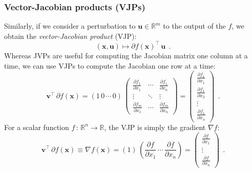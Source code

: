 \documentclass[12pt,dvipsnames]{report}
\renewcommand{\vec}[1]{\boldsymbol{\mathbf{#1}}}
\newcommand{\hquad}{~~}
\begin{document}
\subsubsection{Vector-Jacobian products (VJPs)}
Similarly, if we consider 
a perturbation to $\vec u\in\mathbb{R}^m$ to the output of the $f$, we obtain
the \emph{vector-Jacobian product} (VJP):
\begin{equation}
(\vec{x}, \vec{u}) \mapsto \partial f(\vec{x})^{\intercal}\,\vec u
\hquad.
\label{eq:vjp}
\end{equation}
Whereas JVPs are useful for computing the Jacobian matrix one column at a time, we can use VJPs
to compute the Jacobian one row at a time:
\begin{equation}
    \vec v^\intercal\,\partial f(\vec x)= 
    (1\,0\, \cdots \, 0)\,
    \begin{pmatrix}
\frac{\partial f_{1}}{\partial x_{1}} & \cdots & \frac{\partial f_{1}}{\partial x_{n}} \\
\vdots & \ddots & \vdots \\
\frac{\partial f_{m}}{\partial x_{1}} & \cdots & \frac{\partial f_{m}}{\partial x_{n}}
    \end{pmatrix}
        = \begin{pmatrix}
        \frac{\partial f_{1}}{\partial x_{1}}\\
        \frac{\partial f_{1}}{\partial x_{2}}\\
        \vdots\\
        \frac{\partial f_{1}}{\partial x_{n}}
    \end{pmatrix}
    \hquad.
\end{equation}
For a scalar function $f\,:\,\mathbb{R}^n\rightarrow\mathbb{R}$, the VJP is simply the gradient 
$\nabla f$:
\begin{equation}
    \vec v^\intercal\,\partial f(\vec x)\equiv \nabla f(\vec x)=
    \left(1\right)\,\left(  \frac{\partial f}{\partial x_{1}} \,\cdots\,\frac{\partial f}{\partial x_{n}}   \right)
    =\begin{pmatrix}
        \frac{\partial f}{\partial x_{1}}\\
        \vdots\\
        \frac{\partial f}{\partial x_{n}}
    \end{pmatrix}
    \hquad.
\end{equation}
\end{document}
